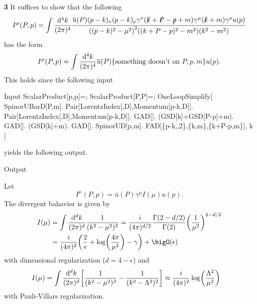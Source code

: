 \documentclass{article}
\makeatletter
\newcommand*{\shifttext}[1]{%
  \settowidth{\@tempdima}{#1}%
  \hspace{-\@tempdima}#1%
}
\newcommand{\plabel}[1]{%
\shifttext{\textbf{#1}\quad}%
}
\newcommand{\prule}{%
\begin{center}%
\hdashrule[0.5ex]{.99\linewidth}{1pt}{1pt 2.5pt}%
\end{center}%
}
\makeatother
\begin{document}
\plabel{3}%
It suffices to show that the following
\[ I^\mu(P,p) = \int \frac{\dd[4]{k}}{(2\pi)^4} \frac{\overline{u}(P)(p-k)_\nu (p-k)_\rho \gamma^\nu (\slashed{k} + \slashed{P} - \slashed{p} + m) \gamma^\mu (\slashed{k}+m) \gamma^\rho u(p)}{\qty((p-k)^2 - \mu^2)^2 \qty((k+P-p)^2 - m^2) (k^2 - m^2)} \]
has the form
\[ I^\mu(P,p) = \int \frac{\dd[4]{k}}{(2\pi)^4} \overline{u}(P) \qty{\text{something doesn't on $P,p,m$}} u(p). \]
This holds since the following input
\begin{mmaCell}[moredefined={ScalarProduct, OneLoopSimplify, SpinorUBarD, Pair, LorentzIndex, Momentum, GAD, GSD, SpinorUD, FAD}]{Input}
ScalarProduct[p,p]=;
ScalarProduct[P,P]=;
OneLoopSimplify[
    SpinorUBarD[P,m].
    Pair[LorentzIndex[\mmaUnd{\(\pmb{\nu}\)},D],Momentum[p-k,D]].
    Pair[LorentzIndex[\mmaUnd{\(\pmb{\rho}\)},D],Momentum[p-k,D]].
    GAD[\mmaUnd{\(\pmb{\nu}\)}].
    (GSD[k]+GSD[P-p]+m).
    GAD[\mmaUnd{\(\pmb{\mu}\)}].
    (GSD[k]+m).
    GAD[\mmaUnd{\(\pmb{\rho}\)}].
    SpinorUD[p,m].
    FAD[\{p-k,\mmaUnd{\(\pmb{\mu}\)},2\},\{k,m\},\{k+P-p,m\}],
    k
]
\end{mmaCell}
yields the following output.
\begin{mmaCell}{Output}
\end{mmaCell}

Let
\[ I^\mu(P,p) =  \overline{u}(P) \gamma^\mu I(\mu) u(p). \]
The divergent bahavior is given by
\begin{align*}
    I(\mu) &= \int \frac{\dd[d]{k}}{(2\pi)^d} \frac{1}{(k^2 - \mu^2)^2} = \frac{i}{(4\pi)^{d/2}}\frac{\Gamma(2-d/2)}{\Gamma(2)} \qty(\frac{1}{\mu^2})^{2-d/2} \\
    &= \frac{i}{(4\pi)^2}\qty(\frac{2}{\epsilon} + \log(\frac{4\pi}{\mu^2}) - \gamma) + \bigO(\epsilon)
\end{align*}
with dimensional regularization ($d=4-\epsilon$) and
\begin{align*}
    I(\mu) &= \int \frac{\dd[d]{k}}{(2\pi)^d} \qty[\frac{1}{(k^2 - \mu^2)^2} - \frac{1}{(k^2 - \Lambda^2)^2}] \approx \frac{i}{(4\pi)^2} \log(\frac{\Lambda^2}{\mu^2})
\end{align*}
with Pauli-Villars regularization.

\prule
\end{document}
